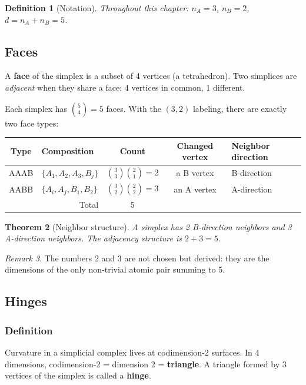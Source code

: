 \documentclass[12pt]{article}
\newtheorem{theorem}{Theorem}[section]
\newtheorem{definition}[theorem]{Definition}
\theoremstyle{remark}
\newtheorem{remark}[theorem]{Remark}
\theoremstyle{definition}
\begin{document}
\begin{definition}[Notation]
Throughout this chapter: $n_A = 3$, $n_B = 2$, $d = n_A + n_B = 5$.
\end{definition}

\subsection{Faces}

A \textbf{face} of the simplex is a subset of 4 vertices (a tetrahedron). Two simplices are \emph{adjacent} when they share a face: 4 vertices in common, 1 different.

Each simplex has $\binom{5}{4} = 5$ faces. With the $(3,2)$ labeling, there are exactly two face types:

\begin{center}
\begin{tabular}{clccl}
\hline
Type & Composition & Count & Changed vertex & Neighbor direction \\
\hline
AAAB & $\{A_1, A_2, A_3, B_j\}$ & $\binom{3}{3}\binom{2}{1} = 2$ & a B vertex & B-direction \\
AABB & $\{A_i, A_j, B_1, B_2\}$ & $\binom{3}{2}\binom{2}{2} = 3$ & an A vertex & A-direction \\
\hline
\multicolumn{2}{r}{Total} & 5 & & \\
\hline
\end{tabular}
\end{center}

\begin{theorem}[Neighbor structure]
A simplex has 2 B-direction neighbors and 3 A-direction neighbors. The adjacency structure is $2 + 3 = 5$.
\end{theorem}

\begin{remark}
The numbers 2 and 3 are not chosen but derived: they are the dimensions of the only non-trivial atomic pair summing to 5.
\end{remark}

\subsection{Hinges}

\subsubsection{Definition}

Curvature in a simplicial complex lives at codimension-2 surfaces. In 4 dimensions, codimension-2 = dimension 2 = \textbf{triangle}. A triangle formed by 3 vertices of the simplex is called a \textbf{hinge}.
\end{document}
